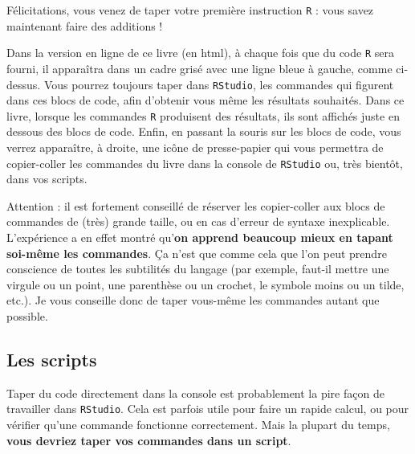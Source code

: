 \documentclass[
  a4paper,
  DIV=11,
  numbers=noendperiod,
  oneside]{scrreprt}
\begin{document}
Félicitations, vous venez de taper votre première instruction \texttt{R}
: vous savez maintenant faire des additions !

Dans la version en ligne de ce livre (en html), à chaque fois que du
code \texttt{R} sera fourni, il apparaîtra dans un cadre grisé avec une
ligne bleue à gauche, comme ci-dessus. Vous pourrez toujours taper dans
\texttt{RStudio}, les commandes qui figurent dans ces blocs de code,
afin d'obtenir vous même les résultats souhaités. Dans ce livre, lorsque
les commandes \texttt{R} produisent des résultats, ils sont affichés
juste en dessous des blocs de code. Enfin, en passant la souris sur les
blocs de code, vous verrez apparaître, à droite, une icône de
presse-papier qui vous permettra de copier-coller les commandes du livre
dans la console de \texttt{RStudio} ou, très bientôt, dans vos scripts.

\begin{tcolorbox}[enhanced jigsaw, arc=.35mm, opacityback=0, colbacktitle=quarto-callout-warning-color!10!white, bottomrule=.15mm, coltitle=black, colframe=quarto-callout-warning-color-frame, breakable, toprule=.15mm, title=\textcolor{quarto-callout-warning-color}{\faExclamationTriangle}\hspace{0.5em}{Les risques du ``copier-coller'' {\faIcon{clipboard}}}, leftrule=.75mm, titlerule=0mm, bottomtitle=1mm, toptitle=1mm, left=2mm, rightrule=.15mm, opacitybacktitle=0.6, colback=white]

Attention : il est fortement conseillé de réserver les copier-coller aux
blocs de commandes de (très) grande taille, ou en cas d'erreur de
syntaxe inexplicable. L'expérience a en effet montré qu'\textbf{on
apprend beaucoup mieux {en tapant soi-même les commandes}}. Ça n'est que
comme cela que l'on peut prendre conscience de toutes les subtilités du
langage (par exemple, faut-il mettre une virgule ou un point, une
parenthèse ou un crochet, le symbole moins ou un tilde, etc.). Je vous
conseille donc de taper vous-même les commandes autant que possible.

\end{tcolorbox}

\subsection{Les scripts}\label{sec-script}

Taper du code directement dans la console est probablement la pire façon
de travailler dans \texttt{RStudio}. Cela est parfois utile pour faire
un rapide calcul, ou pour vérifier qu'une commande fonctionne
correctement. Mais la plupart du temps, \textbf{vous devriez taper vos
commandes dans un script}.
\end{document}

